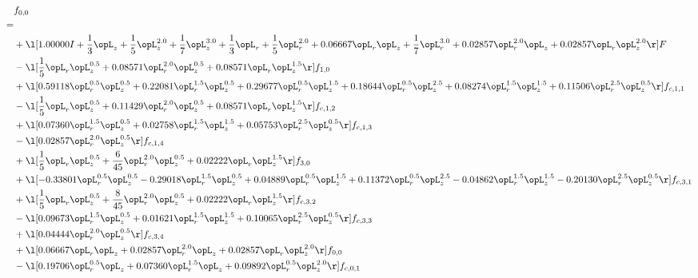 \begin{alignat}{2} 
\label{eq:f_00_1} 
& f_{0,0} \nonumber \\ 
 = \\ 
& + \l[  1.00000 I + \frac{1}{3} \opL_z + \frac{1}{5} \opL_z^{2.0} + \frac{1}{7} \opL_z^{3.0} + \frac{1}{3} \opL_r + \frac{1}{5} \opL_r^{2.0} +  0.06667 \opL_r \opL_z + \frac{1}{7} \opL_r^{3.0} +  0.02857 \opL_r^{2.0} \opL_z +  0.02857 \opL_r \opL_z^{2.0}  \r] F \nonumber \\ 
& - \l[ \frac{1}{5} \opL_r \opL_z^{0.5} +  0.08571 \opL_r^{2.0} \opL_z^{0.5} +  0.08571 \opL_r \opL_z^{1.5}  \r] f_{1,0} \nonumber \\ 
& + \l[  0.59118 \opL_r^{0.5} \opL_z^{0.5} +  0.22081 \opL_r^{1.5} \opL_z^{0.5} +  0.29677 \opL_r^{0.5} \opL_z^{1.5} +  0.18644 \opL_r^{0.5} \opL_z^{2.5} +  0.08274 \opL_r^{1.5} \opL_z^{1.5} +  0.11506 \opL_r^{2.5} \opL_z^{0.5}  \r] f_{c,1,1} \nonumber \\ 
& - \l[ \frac{1}{5} \opL_r \opL_z^{0.5} +  0.11429 \opL_r^{2.0} \opL_z^{0.5} +  0.08571 \opL_r \opL_z^{1.5}  \r] f_{c,1,2} \nonumber \\ 
& + \l[  0.07360 \opL_r^{1.5} \opL_z^{0.5} +  0.02758 \opL_r^{1.5} \opL_z^{1.5} +  0.05753 \opL_r^{2.5} \opL_z^{0.5}  \r] f_{c,1,3} \nonumber \\ 
& - \l[  0.02857 \opL_r^{2.0} \opL_z^{0.5}  \r] f_{c,1,4} \nonumber \\ 
& + \l[ \frac{1}{5} \opL_r \opL_z^{0.5} + \frac{6}{45} \opL_r^{2.0} \opL_z^{0.5} +  0.02222 \opL_r \opL_z^{1.5}  \r] f_{3,0} \nonumber \\ 
& + \l[  -0.33801 \opL_r^{0.5} \opL_z^{0.5}   -0.29018 \opL_r^{1.5} \opL_z^{0.5} +  0.04889 \opL_r^{0.5} \opL_z^{1.5} +  0.11372 \opL_r^{0.5} \opL_z^{2.5}   -0.04862 \opL_r^{1.5} \opL_z^{1.5}   -0.20130 \opL_r^{2.5} \opL_z^{0.5}  \r] f_{c,3,1} \nonumber \\ 
& + \l[ \frac{1}{5} \opL_r \opL_z^{0.5} + \frac{8}{45} \opL_r^{2.0} \opL_z^{0.5} +  0.02222 \opL_r \opL_z^{1.5}  \r] f_{c,3,2} \nonumber \\ 
& - \l[  0.09673 \opL_r^{1.5} \opL_z^{0.5} +  0.01621 \opL_r^{1.5} \opL_z^{1.5} +  0.10065 \opL_r^{2.5} \opL_z^{0.5}  \r] f_{c,3,3} \nonumber \\ 
& + \l[  0.04444 \opL_r^{2.0} \opL_z^{0.5}  \r] f_{c,3,4} \nonumber \\ 
& + \l[  0.06667 \opL_r \opL_z +  0.02857 \opL_r^{2.0} \opL_z +  0.02857 \opL_r \opL_z^{2.0}  \r] f_{0,0} \nonumber \\ 
& - \l[  0.19706 \opL_r^{0.5} \opL_z +  0.07360 \opL_r^{1.5} \opL_z +  0.09892 \opL_r^{0.5} \opL_z^{2.0}  \r] f_{c,0,1} \nonumber \\ 

\end{alignat}
